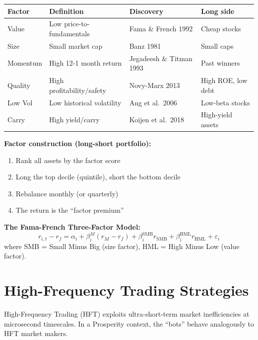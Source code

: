 \documentclass[12pt,a4paper,openany]{report}
\theoremstyle{definition}
\begin{document}
\begin{center}
\begin{tabular}{llll}
\toprule
\textbf{Factor} & \textbf{Definition} & \textbf{Discovery} & \textbf{Long side} \\
\midrule
Value    & Low price-to-fundamentals & Fama \& French 1992 & Cheap stocks \\
Size     & Small market cap & Banz 1981 & Small caps \\
Momentum & High 12-1 month return & Jegadeesh \& Titman 1993 & Past winners \\
Quality  & High profitability/safety & Novy-Marx 2013 & High ROE, low debt \\
Low Vol  & Low historical volatility & Ang et al.\ 2006 & Low-beta stocks \\
Carry    & High yield/carry & Koijen et al.\ 2018 & High-yield assets \\
\bottomrule
\end{tabular}
\end{center}

\textbf{Factor construction (long-short portfolio):}
\begin{enumerate}[label=\arabic*.]
  \item Rank all assets by the factor score
  \item Long the top decile (quintile), short the bottom decile
  \item Rebalance monthly (or quarterly)
  \item The return is the ``factor premium''
\end{enumerate}

\textbf{The Fama-French Three-Factor Model:}
\begin{equation}
  r_{i,t} - r_f = \alpha_i + \beta_i^M(r_M - r_f) + \beta_i^{\text{SMB}} r_{\text{SMB}} + \beta_i^{\text{HML}} r_{\text{HML}} + \varepsilon_i
\end{equation}
where SMB = Small Minus Big (size factor), HML = High Minus Low (value factor).

\section{High-Frequency Trading Strategies}

High-Frequency Trading (HFT) exploits ultra-short-term market inefficiencies at microsecond timescales. In a Prosperity context, the ``bots'' behave analogously to HFT market makers.
\end{document}
